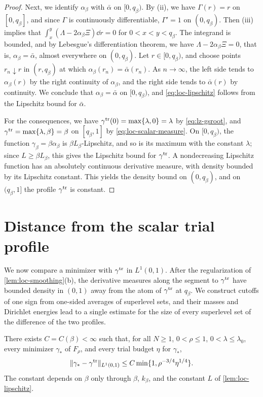 \begin{proof}
Next, we identify $\alpha_\beta$ with $\bar\alpha$ on $[0,q_\beta)$. By (ii),
we have $\Gamma(r)=r$ on $[0,q_\beta]$, and since $\Gamma$ is continuously
differentiable, $\Gamma'=1$ on $(0,q_\beta)$. Then (iii) implies that
$\int_x^y(\Lambda-2\alpha_\beta\Xi)\dd r=0$ for $0<x<y<q_\beta$. The integrand
is bounded, and by Lebesgue's differentiation theorem, we have
$\Lambda-2\alpha_\beta\Xi=0$, that is, $\alpha_\beta=\bar\alpha$, almost
everywhere on $(0,q_\beta)$. Let $r\in[0,q_\beta)$, and choose points
$r_n\downarrow r$ in $(r,q_\beta)$ at which $\alpha_\beta(r_n)=\bar\alpha(r_n)$.
As $n\to\infty$, the left side tends to $\alpha_\beta(r)$ by the right
continuity of $\alpha_\beta$, and the right side tends to $\bar\alpha(r)$ by
continuity. We conclude that $\alpha_\beta=\bar\alpha$ on $[0,q_\beta)$, and
\eqref{eq:loc-lipschitz} follows from the Lipschitz bound for $\bar\alpha$.

For the consequences, we have $\gamma^{\rm tr}(0)=\max\{\lambda,0\}=\lambda$ by
\eqref{eq:lz-gsroot}, and $\gamma^{\rm tr}=\max\{\lambda,\beta\}=\beta$ on
$[q_\beta,1]$ by \eqref{eq:loc-scalar-measure}. On $[0,q_\beta)$, the function
$\gamma_\beta=\beta\alpha_\beta$ is $\beta L_\beta$-Lipschitz, and so is its
maximum with the constant $\lambda$; since $L\ge\beta L_\beta$, this gives the
Lipschitz bound for $\gamma^{\rm tr}$. A nondecreasing Lipschitz function has
an absolutely continuous derivative measure, with density bounded by its
Lipschitz constant. This yields the density bound on $(0,q_\beta)$, and on
$(q_\beta,1]$ the profile $\gamma^{\rm tr}$ is constant.
\end{proof}

\section{Distance from the scalar trial profile}

We now compare a minimizer with $\gamma^{\rm tr}$ in $L^1(0,1)$. After the
regularization of \cref{lem:loc-smoothing}(b), the derivative measures along
the segment to $\gamma^{\rm tr}$ have bounded density in $(0,1)$ away from the
atom of $\gamma^{\rm tr}$ at $q_\beta$. We construct cutoffs of one sign from
one-sided averages of superlevel sets, and their masses and Dirichlet energies
lead to a single estimate for the size of every superlevel set of the
difference of the two profiles.

\begin{proposition}\label{prop:loc-isolation}
There exists $C=C(\beta)<\infty$ such that, for all $N\ge1$, $0<\rho\le1$,
$0<\lambda\le\lambda_0$, every minimizer $\gamma_*$ of $F_\rho$, and every
trial budget $\eta$ for $\gamma_*$,
\begin{equation}\label{eq:loc-isolation}
 \|\gamma_*-\gamma^{\rm tr}\|_{L^1(0,1)}\le C\min\{1,\rho^{-3/4}\eta^{1/4}\}.
\end{equation}
The constant depends on $\beta$ only through $\beta$, $k_\beta$, and the
constant $L$ of \cref{lem:loc-lipschitz}.
\end{proposition}

